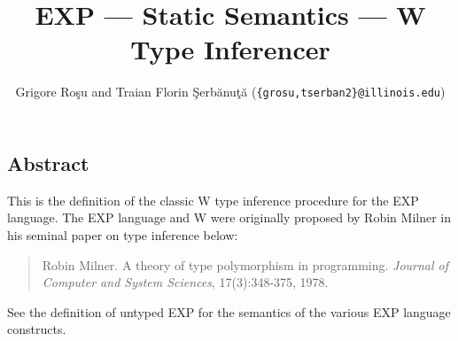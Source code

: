 \setlength{\parindent}{1em}
\title{EXP --- Static Semantics --- W Type Inferencer}
\author{Grigore Ro\c{s}u and
        Traian Florin \c{S}erb\u{a}nu\c{t}\u{a}
	(\texttt{\{grosu,tserban2\}@illinois.edu})}

\maketitle

\begin{kblock}[text]
\section{Abstract}
This is the \K definition of the classic W type inference procedure
for the EXP language.  The EXP language and W were originally proposed
by Robin Milner in his seminal paper on type inference below:
\begin{quote}
Robin Milner. A theory of type polymorphism in programming.
{\em Journal of Computer and System Sciences}, 17(3):348-375, 1978.
\end{quote}
See the \K definition of untyped EXP for the semantics of the various
EXP language constructs.
\end{kblock}

\vspace*{3ex}


